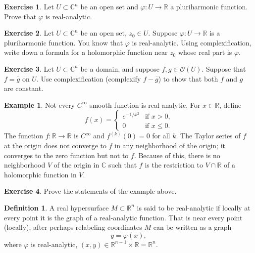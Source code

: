 \documentclass[12pt,openany]{book}
\newcommand{\C}{{\mathbb{C}}}
\newcommand{\R}{{\mathbb{R}}}
\newcommand{\sO}{{\mathscr{O}}}
\theoremstyle{plain}
\theoremstyle{remark}
\theoremstyle{definition}
\newtheorem{defn}[thm]{Definition}
\newenvironment{exbox}{%
    \def\FrameCommand{\vrule width 1pt \relax\hspace{10pt}}%
    \MakeFramed {\advance \hsize -\width \FrameRestore}%
}{%
    \endMakeFramed
}
\theoremstyle{exercise}
\newtheorem{exercise}{Exercise}[section]
\theoremstyle{example}
\newtheorem{example}[thm]{Example}
\begin{document}
\begin{exbox}
\begin{exercise}
Let $U \subset \C^n$ be an open set and $\varphi \colon U \to \R$ a
pluriharmonic function.  Prove that $\varphi$ is real-analytic.
\end{exercise}

\begin{exercise}
Let $U \subset \C^n$ be an open set, $z_0 \in U$.
Suppose $\varphi \colon U \to \R$ is a pluriharmonic function.
You know that $\varphi$ is real-analytic.
Using complexification, write down a formula for a holomorphic function near
$z_0$ whose real part is $\varphi$.
\end{exercise}

\begin{exercise}
Let $U \subset \C^n$ be a domain, and suppose $f, g \in \sO(U)$.
Suppose that $f = \bar{g}$ on $U$.  Use complexification (complexify
$f-\bar{g}$) to show that both $f$ and $g$ are constant.
\end{exercise}
\end{exbox}

\begin{example}
Not every $C^\infty$ smooth function is real-analytic.  For $x \in \R$,
define
\begin{equation*}
f(x) =
\begin{cases}
e^{-1/x^2} & \text{if $x > 0$,} \\
0 & \text{if $x \leq 0$.}
\end{cases}
\end{equation*}
The function
$f \colon \R \to \R$ is $C^\infty$ and $f^{(k)}(0) = 0$ for all $k$.
The Taylor series of $f$ at the origin does
not converge to $f$ in any neighborhood of the origin; it converges to the
zero function but not to $f$.
Because of this, there is no neighborhood $V$ of the origin in $\C$ such that
$f$ is the restriction to $V \cap \R$ of a holomorphic function in $V$.
\end{example}

\begin{exbox}
\begin{exercise}
Prove the statements of the example above.
\end{exercise}
\end{exbox}

\begin{defn}
A real hypersurface $M \subset \R^n$ is said to be real-analytic
if locally at every point it is the graph of a real-analytic function.  That
is near every point (locally), after perhaps relabeling coordinates $M$ can be written as
a graph
\begin{equation*}
y = \varphi(x) ,
\end{equation*}
where $\varphi$ is real-analytic, $(x,y) \in \R^{n-1} \times \R = \R^n$.
\end{defn}
\end{document}
